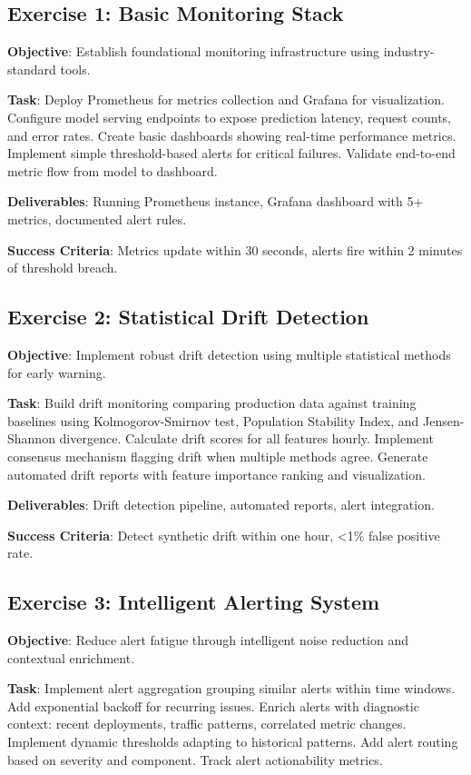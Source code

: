 \subsection{Exercise 1: Basic Monitoring Stack}

\textbf{Objective}: Establish foundational monitoring infrastructure using industry-standard tools.

\textbf{Task}: Deploy Prometheus for metrics collection and Grafana for visualization. Configure model serving endpoints to expose prediction latency, request counts, and error rates. Create basic dashboards showing real-time performance metrics. Implement simple threshold-based alerts for critical failures. Validate end-to-end metric flow from model to dashboard.

\textbf{Deliverables}: Running Prometheus instance, Grafana dashboard with 5+ metrics, documented alert rules.

\textbf{Success Criteria}: Metrics update within 30 seconds, alerts fire within 2 minutes of threshold breach.

\subsection{Exercise 2: Statistical Drift Detection}

\textbf{Objective}: Implement robust drift detection using multiple statistical methods for early warning.

\textbf{Task}: Build drift monitoring comparing production data against training baselines using Kolmogorov-Smirnov test, Population Stability Index, and Jensen-Shannon divergence. Calculate drift scores for all features hourly. Implement consensus mechanism flagging drift when multiple methods agree. Generate automated drift reports with feature importance ranking and visualization.

\textbf{Deliverables}: Drift detection pipeline, automated reports, alert integration.

\textbf{Success Criteria}: Detect synthetic drift within one hour, <1\% false positive rate.

\subsection{Exercise 3: Intelligent Alerting System}

\textbf{Objective}: Reduce alert fatigue through intelligent noise reduction and contextual enrichment.

\textbf{Task}: Implement alert aggregation grouping similar alerts within time windows. Add exponential backoff for recurring issues. Enrich alerts with diagnostic context: recent deployments, traffic patterns, correlated metric changes. Implement dynamic thresholds adapting to historical patterns. Add alert routing based on severity and component. Track alert actionability metrics.

